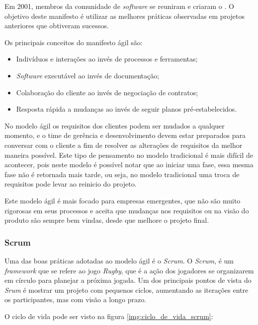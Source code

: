 Em 2001, membros da comunidade de \textit{software} se reuniram e criaram o . O objetivo deste manifesto é utilizar as melhores práticas observadas em projetos anteriores que obtiveram sucessos.

Os principais conceitos do manifesto ágil são:

\begin{itemize}
	\item Indivíduos e interações ao invés de processos e ferramentas;
	\item \textit{Software} executável ao invés de documentação;
	\item Colaboração do cliente ao invés de negociação de contratos;
	\item Resposta rápida a mudanças ao invés de seguir planos pré-estabelecidos.
\end{itemize}

No modelo ágil os requisitos dos clientes podem ser mudados a qualquer momento, e o time de gerência e desenvolvimento devem estar preparados para conversar com o cliente a fim de resolver as alterações de requisitos da melhor maneira possível. Este tipo de pensamento no modelo tradicional é mais difícil de acontecer, pois neste modelo é possível notar que ao iniciar uma fase, essa mesma fase não é retornada mais tarde, ou seja, no modelo tradicional uma troca de requisitos pode levar ao reinicio do projeto.

Este modelo ágil é mais focado para empresas emergentes, que não são muito rigorosas em seus processos e aceita que mudanças nos requisitos ou na visão do produto são sempre bem vindas, desde que melhore o projeto final.

\subsubsection{Scrum}
\label{sec:scrum}

Uma das boas práticas adotadas ao modelo ágil é o \textit{Scrum}. O \textit{Scrum}, é um \textit{framework} que se refere ao jogo \textit{Rugby}, que é a ação dos jogadores se organizarem em círculo para planejar a próxima jogada. Um dos principais pontos de vista do \textit{Srum} é mostrar um projeto com pequenos ciclos, aumentando as iterações entre os participantes, mas com visão a longo prazo.

O ciclo de vida pode ser visto na figura \ref{img:ciclo_de_vida_scrum}:

